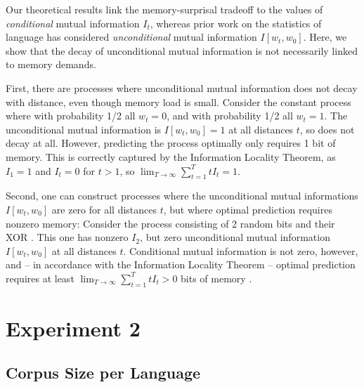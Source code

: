 \documentclass[11pt,letterpaper]{article}
\begin{document}
Our theoretical results link the memory-surprisal tradeoff to the values of \emph{conditional} mutual information $I_t$, whereas prior work on the statistics of language has considered \emph{unconditional} mutual information $I[w_t, w_0]$.
Here, we show that the decay of unconditional mutual information is not necessarily linked to memory demands.

First, there are processes where unconditional mutual information does not decay with distance, even though memory load is small.
Consider the constant process where with probability 1/2 all $w_t = 0$, and with probability 1/2 all $w_t = 1$.
The unconditional mutual information is $I[w_t, w_0] = 1$ at all distances $t$, so does not decay at all.
However, predicting the process optimally only requires 1 bit of memory.
This is correctly captured by the Information Locality Theorem, as $I_1 = 1$ and $I_t = 0$ for $t>1$, so $\lim_{T\rightarrow\infty} \sum_{t=1}^T tI_t = 1$.

Second, one can construct processes where the unconditional mutual informations $I[w_t, w_0]$ are zero for all distances $t$, but where optimal prediction requires nonzero memory:
Consider the process consisting of 2 random bits and their XOR \citep[called RRXOR by][]{crutchfield2003regularities}. This one has nonzero $I_2$, but zero unconditional mutual information $I[w_t, w_0]$ at all distances $t$.
Conditional mutual information is not zero, however, and -- in accordance with the Information Locality Theorem -- optimal prediction requires at least $\lim_{T\rightarrow\infty} \sum_{t=1}^T tI_t > 0$ bits of memory \citep{crutchfield2003regularities}.




\section{Experiment 2}

\subsection{Corpus Size per Language}
\end{document}
